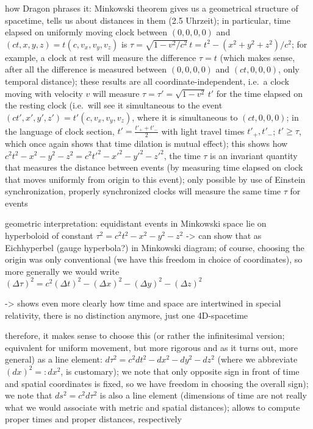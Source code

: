 how Dragon phrases it: Minkowski theorem gives us a geometrical structure of spacetime, tells us about distances in them (2.5 Uhrzeit); in particular, time elapsed on uniformly moving clock between $(0, 0, 0, 0)$ and $(ct, x, y, z) = t (c, v_x, v_y, v_z)$ is $\tau = \sqrt{1 - v^2 / c^2} \, t = t^2 - (x^2 + y^2 + z^2) / c^2$; for example, a clock at rest will measure the difference $\tau = t$ (which makes sense, after all the difference is measured between $(0, 0, 0, 0)$ and $(ct, 0, 0, 0)$, only temporal distance); these results are all coordinate-independent, i.e.~a clock moving with velocity $v$ will measure $\tau = \tau' = \sqrt{1 - v^2} \, t'$ for the time elapsed on the resting clock (i.e.~will see it simultaneous to the event $(ct', x', y', z') = t' (c, v_x, v_y, v_z)$, where it is simultaneous to $(ct, 0, 0, 0)$; in the language of clock section, $t' = \frac{t'_+ + t'_-}{2}$ with light travel times $t'_+, t'_-$; $t' \geq \tau$, which once again shows that time dilation is mutual effect); this shows how $c^2 t^2 - x^2 - y^2 - z^2 = c^2 t'^2 - x'^2 - y'^2 - z'^2$, the time $\tau$ is an invariant quantity that measures the distance between events (by measuring time elapsed on clock that moves uniformly from origin to this event); only possible by use of Einstein synchronization, properly synchronized clocks will measure the same time $\tau$ for events

geometric interpretation: equidistant events in Minkowski space lie on hyperboloid of constant $\tau^2 = c^2 t^2 - x^2 - y^2 - z^2$ -> can show that as Eichhyperbel (gauge hyperbola?) in Minkowski diagram; of course, choosing the origin was only conventional (we have this freedom in choice of coordinates), so more generally we would write $(\Delta \tau)^2 = c^2 (\Delta t)^2 - (\Delta x)^2 - (\Delta y)^2 - (\Delta z)^2$

-> shows even more clearly how time and space are intertwined in special relativity, there is no distinction anymore, just one 4D-spacetime


therefore, it makes sense to choose this (or rather the infinitesimal version; equivalent for uniform movement, but more rigorous and as it turns out, more general) as a line element: $d\tau^2 = c^2 dt^2 - dx^2 - dy^2 - dz^2$ (where we abbreviate $(dx)^2 =: dx^2$, is customary); we note that only opposite sign in front of time and spatial coordinates is fixed, so we have freedom in choosing the overall sign); we note that $ds^2 = c^2 d\tau^2$ is also a line element (dimensions of time are not really what we would associate with metric and spatial distances); allows to compute proper times and proper distances, respectively



